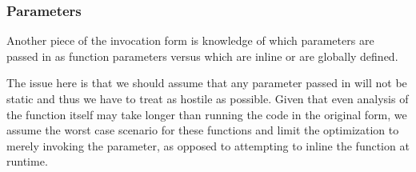 \subsubsection{Parameters}
Another piece of the invocation form is knowledge of which parameters are passed in as function parameters versus which are inline or are globally defined.

The issue here is that we should assume that any parameter passed in will not be static and thus we have to treat as hostile as possible.  Given that even analysis of the function itself may take longer than running the code in the original form, we assume the worst case scenario for these functions and limit the optimization to merely invoking the parameter, as opposed to attempting to inline the function at runtime.